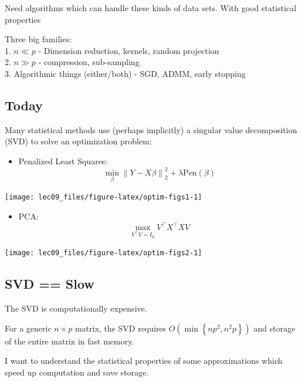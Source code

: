 \documentclass[]{article}
\providecommand{\tightlist}{%
  \setlength{\itemsep}{0pt}\setlength{\parskip}{0pt}}
\begin{document}
Need algorithms which can handle these kinds of data sets. With good
statistical properties

Three big families:\\
1. \(n \ll p\) - Dimension reduction, kernels, random projection\\
2. \(n \gg p\) - compression, sub-sampling\\
3. Algorithmic things (either/both) - SGD, ADMM, early stopping

\hypertarget{today}{%
\subsection{Today}\label{today}}

Many statistical methods use (perhaps implicitly) a singular value
decomposition (SVD) to solve an optimization problem:

\begin{itemize}
\tightlist
\item
  Penalized Least Squares:\\
  \[\min_\beta \left\lVert Y-X\beta \right\rVert_2^2 + \lambda \mbox{Pen}(\beta)\]
\end{itemize}

\begin{center}\texttt{[image: lec09\_files/figure-latex/optim-figs1-1]} \end{center}

\begin{itemize}
\tightlist
\item
  PCA:\\
  \[\max_{V^\top V=I_d} V^\top X^\top X V \]
\end{itemize}

\begin{center}\texttt{[image: lec09\_files/figure-latex/optim-figs2-1]} \end{center}

\hypertarget{svd-slow}{%
\subsection{SVD == Slow}\label{svd-slow}}

The SVD is computationally expensive.

For a generic \(n\times p\) matrix, the SVD requires
\(O\left(\min\left\{np^2,n^2p\right\}\right)\) and storage of the entire
matrix in fast memory.

I want to understand the statistical properties of some approximations
which speed up computation and save storage.
\end{document}
